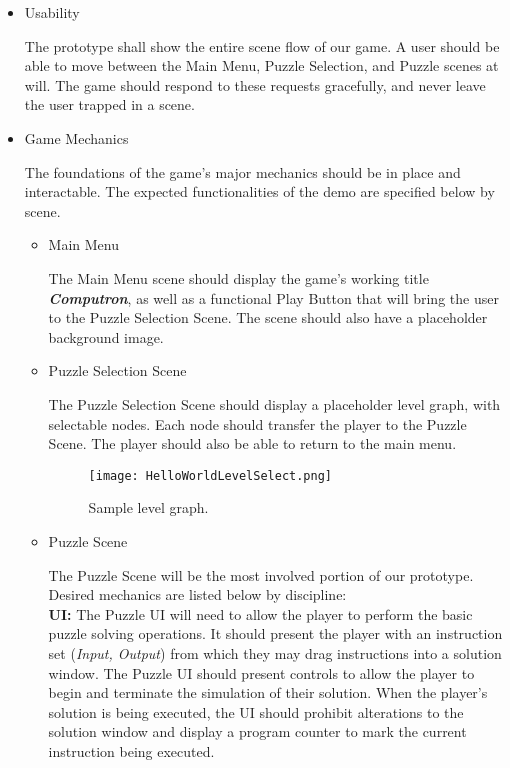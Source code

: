 \begin{itemize}
  \item Usability
  
  The prototype shall show the entire scene flow of our game. A user should be able to move between the Main Menu, Puzzle Selection, and Puzzle scenes at will. The game should respond to these requests gracefully, and never leave the user trapped in a scene. 

  \item Game Mechanics

  The foundations of the game's major mechanics should be in place and interactable. The expected functionalities of the demo are specified below by scene.
  \begin{itemize}
    \item Main Menu
    
    The Main Menu scene should display the game's working title \textbf{\textit{Computron}}, as well as a functional Play Button that will bring the user to the Puzzle Selection Scene. The scene should also have a placeholder background image.

    \item Puzzle Selection Scene
    
    The Puzzle Selection Scene should display a placeholder level graph, with selectable nodes. Each node should transfer the player to the Puzzle Scene. The player should also be able to return to the main menu.

    \begin{figure}[!hb]
      \begin{center}
        \texttt{[image: HelloWorldLevelSelect.png]}
        \caption{Sample level graph.}
        \label{fig:boat1}
      \end{center}
    \end{figure}

    \item Puzzle Scene
    
    The Puzzle Scene will be the most involved portion of our prototype. Desired mechanics are listed below by discipline:\\

    \textbf{UI:} The Puzzle UI will need to allow the player to perform the basic puzzle solving operations. It should present the player with an instruction set (\textit{Input, Output}) from which they may drag instructions into a solution window. The Puzzle UI should present controls to allow the player to begin and terminate the simulation of their solution. When the player's solution is being executed, the UI should prohibit alterations to the solution window and display a program counter to mark the current instruction being executed.\\


\end{itemize}
\end{itemize}
